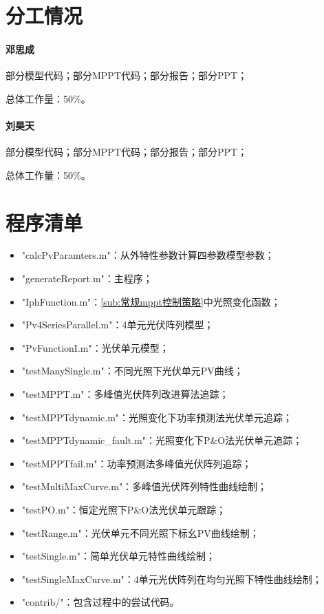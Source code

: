 \documentclass[a4paper,12pt]{article}
\begin{document}
    \begin{appendix}
        \section{分工情况} %
        \label{sec:fengong}
        \paragraph{邓思成} %
        \label{par:邓思成}
        部分模型代码；部分MPPT代码；部分报告；部分PPT；

        总体工作量：50\%。
        \paragraph{刘昊天} %
        \label{par:刘昊天}
        部分模型代码；部分MPPT代码；部分报告；部分PPT；

        总体工作量：50\%。

        \section{程序清单} %
        \label{sec:code}
        \begin{itemize}
          \item "calcPvParamters.m"：从外特性参数计算四参数模型参数；
          \item "generateReport.m"：主程序；
          \item "IphFunction.m"：\cref{sub:常规mppt控制策略}中光照变化函数；
          \item "Pv4SeriesParallel.m"：4单元光伏阵列模型；
          \item "PvFunctionI.m"：光伏单元模型；
          \item "testManySingle.m"：不同光照下光伏单元PV曲线；
          \item "testMPPT.m"：多峰值光伏阵列改进算法追踪；
          \item "testMPPTdynamic.m"：光照变化下功率预测法光伏单元追踪；
          \item "testMPPTdynamic_fault.m"：光照变化下P\&O法光伏单元追踪；
          \item "testMPPTfail.m"：功率预测法多峰值光伏阵列追踪；
          \item "testMultiMaxCurve.m"：多峰值光伏阵列特性曲线绘制；
          \item "testPO.m"：恒定光照下P\&O法光伏单元跟踪；
          \item "testRange.m"：光伏单元不同光照下标幺PV曲线绘制；
          \item "testSingle.m"：简单光伏单元特性曲线绘制；
          \item "testSingleMaxCurve.m"：4单元光伏阵列在均匀光照下特性曲线绘制；
          \item "contrib/"：包含过程中的尝试代码。
        \end{itemize}
    \end{appendix}

\end{document}

